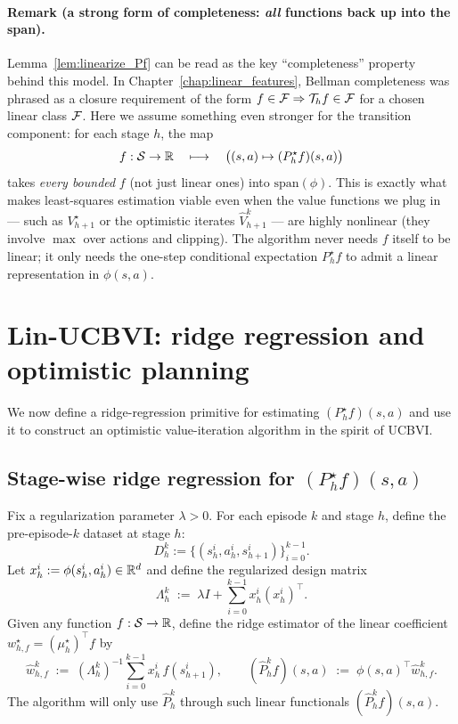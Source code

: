 \paragraph{Remark (a strong form of completeness: \emph{all} functions back up into the span).}
Lemma~\ref{lem:linearize_Pf} can be read as the key ``completeness'' property
behind this model.  In Chapter~\ref{chap:linear_features}, Bellman completeness
was phrased as a closure requirement of the form
$f\in\mathcal{F} \Rightarrow \mathcal{T}_h f\in\mathcal{F}$ for a chosen linear class $\mathcal{F}$.
Here we assume something even stronger for the transition component: for each
stage $h$, the map
\[
f:\mathcal{S}\to\mathbb{R}
\quad\longmapsto\quad
\bigl((s,a)\mapsto (P_h^\star f)(s,a)\bigr)
\]
takes \emph{every bounded} $f$ (not just linear ones) into $\mathrm{span}(\phi)$.
This is exactly what makes least-squares estimation viable even when the value
functions we plug in --- such as $V_{h+1}^\star$ or the optimistic iterates
$\widehat V_{h+1}^k$ --- are highly nonlinear (they involve $\max$ over actions and
clipping).  The algorithm never needs $f$ itself to be linear; it only needs the
one-step conditional expectation $P_h^\star f$ to admit a linear representation
in $\phi(s,a)$.

\section{Lin-UCBVI: ridge regression and optimistic planning}
\label{sec:linear_mdp_ucbvi}

We now define a ridge-regression primitive for estimating $(P_h^\star f)(s,a)$ and use it
to construct an optimistic value-iteration algorithm in the spirit of UCBVI.

\subsection{Stage-wise ridge regression for $(P_h^\star f)(s,a)$}
\label{subsec:linear_mdp_ridge_pf}

Fix a regularization parameter $\lambda>0$.  For each episode $k$ and stage $h$, define the
pre-episode-$k$ dataset at stage $h$:
\[
D_h^k := \{(s_h^i,a_h^i,s_{h+1}^i)\}_{i=0}^{k-1}.
\]
Let $x_h^i:=\phi(s_h^i,a_h^i)\in\mathbb{R}^d$ and define the regularized design matrix
\[
\Lambda_h^k \;:=\; \lambda I + \sum_{i=0}^{k-1} x_h^i (x_h^i)^\top.
\]
Given any function $f:\mathcal{S}\to\mathbb{R}$, define the ridge estimator of the linear coefficient
$w_{h,f}^\star=(\mu_h^\star)^\top f$ by
\[
\widehat w_{h,f}^k
\;:=\;
(\Lambda_h^k)^{-1}\sum_{i=0}^{k-1} x_h^i\,f(s_{h+1}^i),
\qquad
(\widehat P_h^k f)(s,a)
\;:=\;
\phi(s,a)^\top \widehat w_{h,f}^k.
\]
The algorithm will only use $\widehat P_h^k$ through such linear functionals $(\widehat P_h^k f)(s,a)$.

